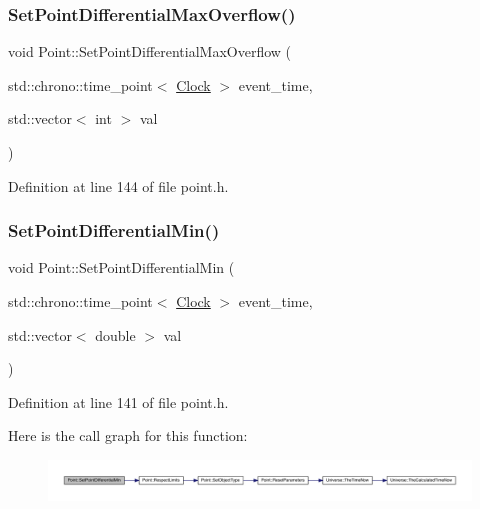 \subsubsection{\texorpdfstring{Set\+Point\+Differential\+Max\+Overflow()}{SetPointDifferentialMaxOverflow()}}
{\footnotesize\ttfamily void Point\+::\+Set\+Point\+Differential\+Max\+Overflow (\begin{DoxyParamCaption}\item[{std\+::chrono\+::time\+\_\+point$<$ \hyperlink{universe_8h_a0ef8d951d1ca5ab3cfaf7ab4c7a6fd80}{Clock} $>$}]{event\+\_\+time,  }\item[{std\+::vector$<$ int $>$}]{val }\end{DoxyParamCaption})\hspace{0.3cm}{\ttfamily [inline]}}



Definition at line 144 of file point.\+h.

\mbox{\label{class_point_a944fcec52017ce88e052a576ef143926}} 
\subsubsection{\texorpdfstring{Set\+Point\+Differential\+Min()}{SetPointDifferentialMin()}}
{\footnotesize\ttfamily void Point\+::\+Set\+Point\+Differential\+Min (\begin{DoxyParamCaption}\item[{std\+::chrono\+::time\+\_\+point$<$ \hyperlink{universe_8h_a0ef8d951d1ca5ab3cfaf7ab4c7a6fd80}{Clock} $>$}]{event\+\_\+time,  }\item[{std\+::vector$<$ double $>$}]{val }\end{DoxyParamCaption})\hspace{0.3cm}{\ttfamily [inline]}}



Definition at line 141 of file point.\+h.

Here is the call graph for this function\+:
\nopagebreak
\begin{figure}[H]
\begin{center}
\leavevmode
\includegraphics[width=350pt]{class_point_a944fcec52017ce88e052a576ef143926_cgraph}
\end{center}
\end{figure}
\mbox{\label{class_point_a582e63ebdbb0979234acb460e673a393}} 
